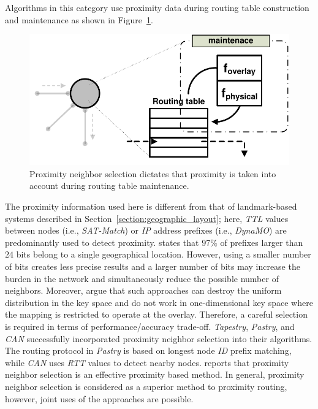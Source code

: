 Algorithms in this category use proximity data during routing table construction
and maintenance as shown in Figure~\ref{figure:proximity-neighbour-selection}.
\begin{figure}[ht]
\centering
  \includegraphics[scale=0.4]{img/pdf/proximity-neighbor-selection.pdf}
\caption{Proximity neighbor selection dictates that proximity is taken into
account during routing table maintenance.}
\label{figure:proximity-neighbour-selection}
\end{figure}
The proximity information used here is different from that of 
landmark-based systems described in Section~\ref{section:geographic_layout};
here, \emph{TTL} values between nodes (i.e., \emph{SAT-Match}) or 
\emph{IP} address prefixes (i.e., \emph{DynaMO}) %
are predominantly used to detect proximity. 
\cite{freedman_iploc_2005} states that $97\%$ of prefixes larger
than $24$ bits belong to a single geographical location. 
However, using a smaller number of bits creates less precise results 
and a larger number of bits may increase the burden in the network
and simultaneously reduce the possible number of neighbors. 
Moreover, \cite{HLYW2005} argue that such approaches can
destroy the uniform distribution in the key space and do not work in
one-dimensional key space where the mapping is restricted to 
operate at the overlay.
Therefore, a careful selection is required in terms of
performance/accuracy trade-off. 
\emph{Tapestry}, \emph{Pastry}, and \emph{CAN} successfully incorporated
proximity neighbor selection into their algorithms. 
The routing protocol in \emph{Pastry} is based on longest node 
\emph{ID} prefix matching, while \emph{CAN} uses \emph{RTT} values to
detect nearby nodes. \cite{CDCR2002a} reports that proximity neighbor
selection is an effective proximity based method.
In general, proximity neighbor selection is considered 
as a superior method to proximity routing, however, joint uses of the 
approaches are possible.

